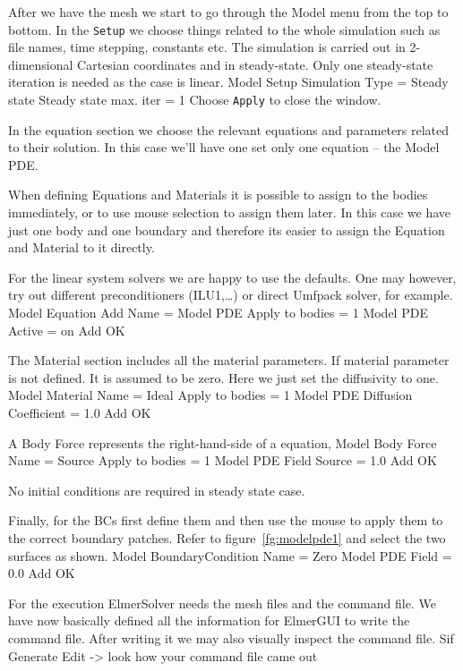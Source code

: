 After we have the mesh we start to go through the Model menu from the top to bottom. 
In the \texttt{Setup} we choose things related to the whole simulation such as file names, 
time stepping, constants etc.  The simulation is carried out in 2-dimensional Cartesian
coordinates and in steady-state. Only one steady-state iteration is needed as the case is linear. 
\ttbegin
Model
  Setup 
    Simulation Type = Steady state
    Steady state max. iter = 1
\ttend
Choose \texttt{Apply} to close the window.

In the equation section we choose the relevant equations and parameters related to their solution. 
In this case we'll have one set only one equation -- the Model PDE.


When defining Equations and Materials it is possible to assign to the bodies immediately, or to use mouse
selection to assign them later. In this case we have just one body and one boundary and therefore its easier to assign 
the Equation and Material to it directly.

For the linear system solvers we are happy to use the defaults. One may however, try out different
preconditioners (ILU1,\ldots) or direct Umfpack solver, for example.
\ttbegin
Model
  Equation
    Add 
      Name = Model PDE
      Apply to bodies = 1
      Model PDE
        Active = on
  Add   
  OK
\ttend        

The Material section includes all the material parameters.
If material parameter is not defined. It is assumed to be zero. 
Here we just set the diffusivity to one.
\ttbegin
Model
  Material
      Name = Ideal
      Apply to bodies = 1 
      Model PDE
        Diffusion Coefficient = 1.0
    Add
    OK
\ttend

A Body Force represents the right-hand-side of a equation,  
\ttbegin
Model
  Body Force
      Name = Source
      Apply to bodies = 1
      Model PDE
        Field Source = 1.0
    Add
    OK
\ttend    

No initial conditions are required in steady state case.

Finally, for the BCs first define them and then use the mouse to apply them to the correct
boundary patches.  Refer to figure~\ref{fg:modelpde1} and select the two surfaces as shown.
\ttbegin
Model
  BoundaryCondition
      Name = Zero
      Model PDE
        Field = 0.0
    Add
    OK
\ttend   


For the execution ElmerSolver needs the mesh files and the command file. We have now basically defined
all the information for ElmerGUI to write the command file. After writing it we may also visually 
inspect the command file.
\ttbegin
Sif 
  Generate
  Edit -> look how your command file came out  
\ttend

